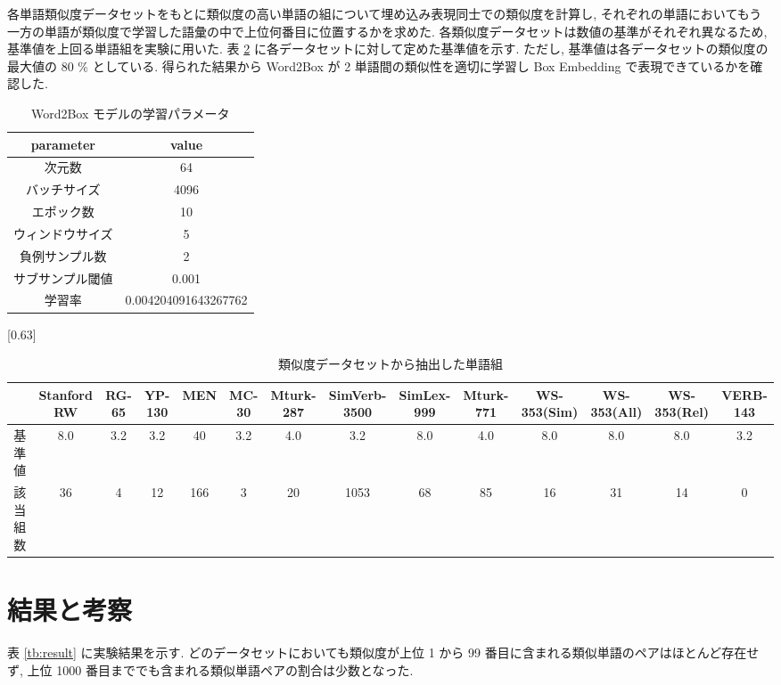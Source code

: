 \documentclass[twocolumn]{jarticle}     %
\begin{document}
各単語類似度データセットをもとに類似度の高い単語の組について埋め込み表現同士での類似度を計算し, それぞれの単語においてもう一方の単語が類似度で学習した語彙の中で上位何番目に位置するかを求めた. 
各類似度データセットは数値の基準がそれぞれ異なるため, 基準値を上回る単語組を実験に用いた. 
表 \ref{tb:dataset_detail} に各データセットに対して定めた基準値を示す. 
ただし, 基準値は各データセットの類似度の最大値の 80 \% としている. 
得られた結果から Word2Box が 2 単語間の類似性を適切に学習し Box Embedding で表現できているかを確認した. 

\begin{table}[th]
  \centering
  \caption{Word2Box モデルの学習パラメータ}
  \label{tb:model_parameter}
  \begin{tabular}{c|c} \hline
      parameter&value \\ \hline
      次元数&64 \\
      バッチサイズ&4096 \\ 
      エポック数&10 \\
      ウィンドウサイズ&5 \\
      負例サンプル数&2 \\
      サブサンプル閾値&0.001 \\
      学習率&0.004204091643267762 \\
      \hline
  \end{tabular}
\end{table}

\begin{table}[th]
  \centering
  \caption{類似度データセットから抽出した単語組}
  \label{tb:dataset_detail}
  \scalebox{0.63}[0.63]{
		\begin{tabular}{c|ccccccccccccc}
			\hline
			
      & Stanford RW & RG-65 & YP-130 & MEN & MC-30 & Mturk-287 & SimVerb-3500 & SimLex-999 & Mturk-771 & WS-353(Sim) & WS-353(All) & WS-353(Rel) & VERB-143 \\ \hline
			基準値  & 8.0         & 3.2   & 3.2    & 40  & 3.2   & 4.0       & 3.2          & 8.0        & 4.0       & 8.0         & 8.0         & 8.0         & 3.2      \\
			該当組数 & 36          & 4     & 12     & 166 & 3     & 20        & 1053         & 68         & 85        & 16          & 31          & 14          & 0        \\ \hline
			\end{tabular}
  }
\end{table}

\section{結果と考察}
表 \ref{tb:result} に実験結果を示す. 
どのデータセットにおいても類似度が上位 1 から 99 番目に含まれる類似単語のペアはほとんど存在せず, 上位 1000 番目まででも含まれる類似単語ペアの割合は少数となった. 
\end{document}
